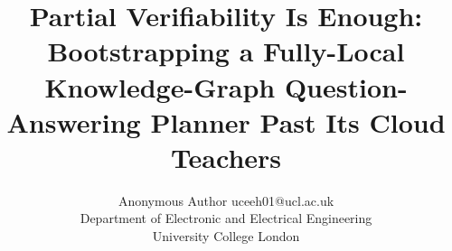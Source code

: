 \documentclass[10pt]{article} %
\title{Partial Verifiability Is Enough: Bootstrapping a Fully-Local
Knowledge-Graph Question-Answering Planner Past Its Cloud Teachers}
\author{\name Anonymous Author \email uceeh01@ucl.ac.uk \\
      \addr Department of Electronic and Electrical Engineering\\
      University College London}
\begin{document}
\maketitle

\begin{abstract}

\end{abstract}













\appendix

\end{document}

